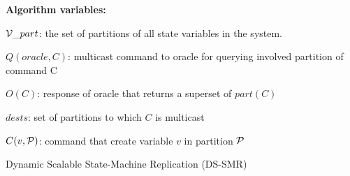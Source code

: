 \begin{algorithm}
\begin{distribalgo}[1]
\vspace{1.5mm}

\textbf{Algorithm variables:}

\vspace{1mm}

$\mathcal{V}\_part$: the set of partitions of all state variables in the system.

\vspace{1mm}

$Q(oracle, C)$: multicast command to oracle for querying involved partition of command C

\vspace{1mm}

$O(C)$: response of oracle that returns a superset of $part(C)$

\vspace{1mm}

$dests$: set of partitions to which $C$ is multicast

\vspace{1mm}

$C(v, \mathcal{P})$: command that create variable $v$ in partition $\mathcal{P}$

\caption{Dynamic Scalable State-Machine Replication (DS-SMR)}
\label{alg:dynssmr}
\end{distribalgo}
\end{algorithm}